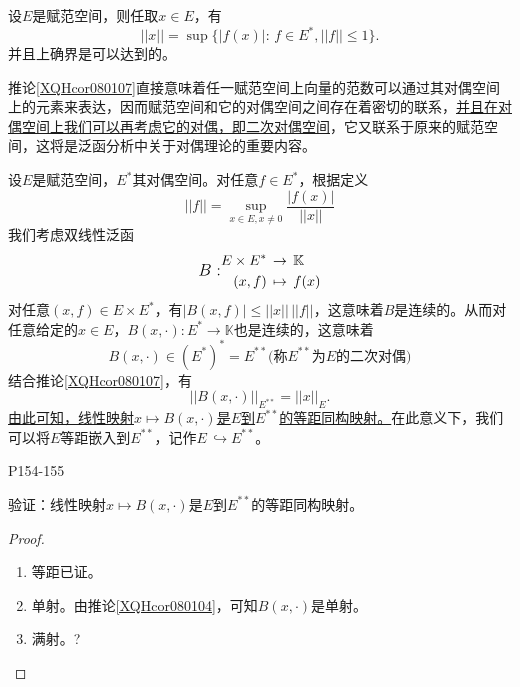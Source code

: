 
\begin{corollary}\label{XQHcor080107}
	设$E$是赋范空间，则任取$x\in E $，有
	\begin{equation*}
		||x||=\sup \{|f(x)|:\, f\in E^{*},||f||\leq 1 \}.
	\end{equation*}
	并且上确界是可以达到的。
\end{corollary}

\original
{
	推论\ref{XQHcor080107}直接意味着任一赋范空间上向量的范数可以通过其对偶空间上的元素来表达，因而赋范空间和它的对偶空间之间存在着密切的联系，\uline{并且在对偶空间上我们可以再考虑它的对偶，即二次对偶空间}，它又联系于原来的赋范空间，这将是泛函分析中关于对偶理论的重要内容。
	\par
	设$E$是赋范空间，$E^{*}$其对偶空间。对任意$f\in E^{*} $，根据定义
	\begin{equation*}
		||f||=\sup_{x\in E,x\neq 0}\frac{|f(x)|}{||x||}
	\end{equation*}
	我们考虑双线性泛函
	\begin{equation*}
		\text{\large $B:$}
		\begin{aligned}
			E\times E^{*}\, &\rightarrow \, \mathbb{K}\\
			(x,f) \, &\mapsto \, f(x)
		\end{aligned}
	\end{equation*}
	对任意$(x,f)\in E\times E^{*} $，有$|B(x,f)|\leq ||x||\, ||f|| $，这意味着$B$是连续的。从而对任意给定的$x\in E $，$B(x,\cdot):E^{*}\rightarrow \mathbb{K} $也是连续的，这意味着
	\begin{equation*}
		B(x,\cdot)\in (E^{*})^{*}=E^{**}\text{(称$E^{**}$为$E$的二次对偶)}
	\end{equation*}
	结合推论\ref{XQHcor080107}，有
	\begin{equation*}
		||B(x,\cdot)||_{E^{**}}=||x||_{E}.
	\end{equation*}
	\underline{由此可知，线性映射$x\mapsto B(x,\cdot) $是$E$到$E^{**} $的等距同构映射。}在此意义下，我们可以将$E$等距嵌入到$E^{**}$，记作$E\,\hookrightarrow E^{**} $。
}
{P154-155}

\begin{proposition}
	验证：线性映射$x\mapsto B(x,\cdot) $是$E$到$E^{**}$的等距同构映射。
\end{proposition}

\begin{proof}
	\begin{enumerate}
		\item 等距已证。
		\item 单射。由推论\ref{XQHcor080104}，可知$B(x,\cdot)$是单射。
		\item 满射。?
	\end{enumerate}
\end{proof}

